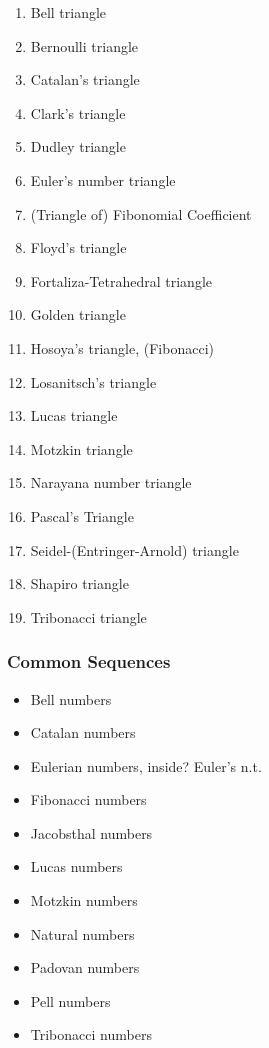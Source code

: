 \documentclass[12pt]{article}
\begin{document}
        \begin{enumerate}
            \item Bell triangle
            \item Bernoulli triangle
            \item Catalan's triangle
            \item Clark's triangle
            
            \item Dudley triangle
            \item Euler's number triangle
            \item (Triangle of) Fibonomial Coefficient
            \item Floyd's triangle
            
            \item Fortaliza-Tetrahedral triangle
            \item Golden triangle
            \item Hosoya's triangle, (Fibonacci)
            \item Losanitsch's triangle
            
            \item Lucas triangle
            \item Motzkin triangle
            \item Narayana number triangle
            \item Pascal's Triangle
            
            \item Seidel-(Entringer-Arnold) triangle
            \item Shapiro triangle
            \item Tribonacci triangle
        \end{enumerate}
        
        \subsubsection{Common Sequences}
        \label{secb:25}
        
        \begin{itemize}
            \item Bell numbers
            \item Catalan numbers
            \item Eulerian numbers, inside? Euler's n.t.
            \item Fibonacci numbers
            
            \item Jacobsthal numbers
            \item Lucas numbers
            \item Motzkin numbers
            \item Natural numbers
            
            \item Padovan numbers
            \item Pell numbers
            \item Tribonacci numbers
        \end{itemize}
    
\end{document}
